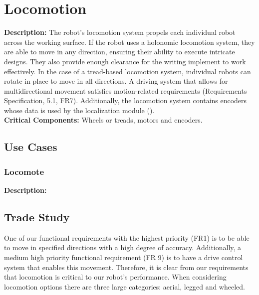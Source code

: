 
\section{Locomotion}
\label{sec:locomotion}
\textbf{Description:} The robot's locomotion system propels each individual robot across the working surface. If the robot uses a holonomic locomotion system, they are able to move in any direction, ensuring their ability to execute intricate designs.  They also provide enough clearance for the writing implement to work effectively. In the case of a tread-based locomotion system, individual robots can rotate in place to move in all directions. A driving system that allows for multidirectional movement satisfies motion-related requirements (Requirements Specification, 5.1, FR7). Additionally, the locomotion system contains encoders whose data is used by the localization module (). \\

\noindent
\textbf{Critical Components:} Wheels or treads, motors and encoders.


\subsection{Use Cases}
\subsubsection{Locomote}
\textbf{Description:} 

\subsection{Trade Study}
\label{sec:trade_locomotion}
One of our functional requirements with the highest priority (FR1) is to be able to move in specified directions with a high degree of accuracy. Additionally, a medium high priority functional requirement (FR 9) is to have a drive control system that enables this movement. Therefore, it is clear from our requirements that locomotion is critical to our robot's performance. When considering locomotion options there are three large categories: aerial, legged and wheeled. 

